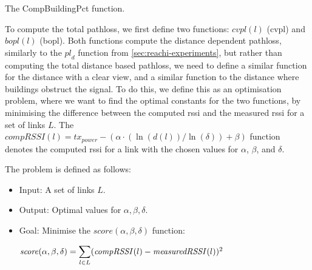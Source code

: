 \begin{algorithm}[ht]
    \DontPrintSemicolon

    \caption{The CompBuildingPct function.}
    \label{algo:linkmodel:compute-building-percentage}
\end{algorithm}

To compute the total \gls{pathloss}, we first define two functions: $\mathit{cvpl}(l)$ (\gls{cvpl}) and
$\mathit{bopl}(l)$ (\gls{bopl}). Both functions compute the distance dependent \gls{pathloss}, similarly to
the $\mathit{pl}_d$ function from \autoref{sec:reachi-experiments}, but rather than computing the total
distance based \gls{pathloss}, we need to define a similar function for the distance with a clear view, and a
similar function to the distance where buildings obstruct the signal. To do this, we define this as an
optimisation problem, where we want to find the optimal constants for the two functions, by minimising the
difference between the computed \gls{rssi} and the measured \gls{rssi} for a set of links $L$. The
$\mathit{compRSSI}(l) = \mathit{tx}_\mathit{power} - (\alpha \cdot (\ln(d(l)) / \ln(\delta)) + \beta)$
function denotes the computed \gls{rssi} for a link with the chosen values for $\alpha$, $\beta$, and
$\delta$.
\medbreak

The problem is defined as follows:

\begin{itemize}
    \item Input: A set of links $L$.
    \item Output: Optimal values for $\alpha, \beta, \delta$.
    \item Goal: Minimise the $\mathit{score}(\alpha, \beta, \delta)$ function:

          $\mathit{score}(\alpha, \beta, \delta) = \mathlarger{\sum}\limits_{l \in L} (\mathit{compRSSI}(l) - \mathit{measuredRSSI}(l))^2$
\end{itemize}

